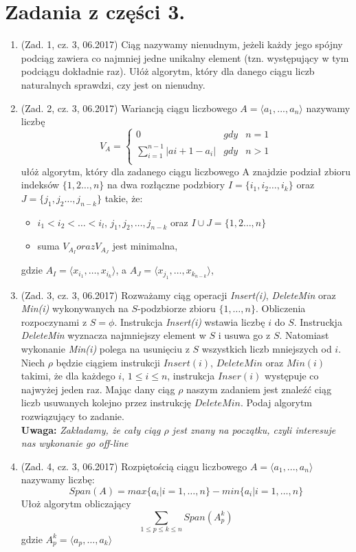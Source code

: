 \documentclass[10pt]{article}%
\begin{document}
\section*{Zadania z części 3.}
\begin{enumerate}

\item (Zad. 1, cz. 3, 06.2017) Ciąg nazywamy nienudnym, jeżeli każdy jego spójny podciąg zawiera co najmniej jedne unikalny element (tzn. występujący w tym podciągu dokładnie raz). Ułóż algorytm, który dla danego ciągu liczb naturalnych sprawdzi, czy jest on nienudny.

\item (Zad. 2, cz. 3, 06.2017) Wariancją ciągu liczbowego $A = \langle a_1, ..., a_n \rangle $ nazywamy liczbę 
$$V_A = \left\{\begin{array}{rcl}
0&gdy&n=1\\
\sum_{i=1}^{n-1} |a{i+1}-a_i|&gdy&n>1\\
\end{array} \right.$$
ułóż algorytm, który dla zadanego ciągu liczbowego A znajdzie podział zbioru indeksów $\{1,2\ldots,n\}$ na dwa rozłączne podzbiory $I = \{i_1,i_2\ldots,i_k\}$ oraz $J = \{j_1,j_2\ldots,j_{n-k}\}$ takie, że:
\begin{itemize}
	\item $ i_1 < i_2 < \ldots < i_l$, $ j_1, j_2, \ldots, j_{n-k}$ oraz $I \cup J = \{1,2\ldots,n\}$
	\item suma $V_{A_I} oraz V_{A_J}$ jest minimalna, 
\end{itemize}
gdzie $A_I = \langle x_{i_1}, \ldots, x_{i_k} \rangle$, a $A_J = \langle x_{j_1}, \ldots, x_{k_{n-k}} \rangle$,  

\item (Zad. 3, cz. 3, 06.2017) Rozważamy ciąg operacji \textit{Insert(i)}, \textit{DeleteMin} oraz \textit{Min(i)} wykonywanych na $S$-podzbiorze zbioru $\{1,\ldots,n\}$. Obliczenia rozpoczynami z $S = \phi$. Instrukcja \textit{Insert(i)} wstawia liczbę $i$ do $S$. Instruckja \textit{DeleteMin} wyznacza najmniejszy element w $S$ i usuwa go z $S$. Natomiast wykonanie \textit{Min(i)} polega na usunięciu z $S$ wszystkich liczb mniejszych od $i$. \\
Niech $\rho$ będzie ciągiem instrukcji $Insert(i)$, $DeleteMin$ oraz $Min(i)$ takimi, że dla każdego $i$, $1\leq i \leq n$, instrukcja $Inser(i)$ występuje co najwyżej jeden raz. Mając dany ciąg $\rho$ naszym zadaniem jest znaleźć ciąg liczb usuwanych kolejno przez instrukcję $DeleteMin$. Podaj algorytm rozwiązujący to zadanie. \\
\textbf{Uwaga:} \textit{Zakładamy, że cały ciąg $\rho$ jest znany na początku, czyli interesuje nas wykonanie go off-line}

\item (Zad. 4, cz. 3, 06.2017) Rozpiętością ciągu liczbowego $A = \langle a_1, ..., a_n \rangle $ nazywamy liczbę:
$$Span(A) = max \{a_i | i = 1,\ldots,n\} - min\{a_i | i = 1,\ldots,n\}$$
Ułoż algorytm obliczający 
$$ \sum_{1 \leq p \leq k \leq n} Span(A_p^k)$$
gdzie $A_p^k = \langle a_p,\ldots,a_k \rangle$

\end{enumerate}
\end{document}
